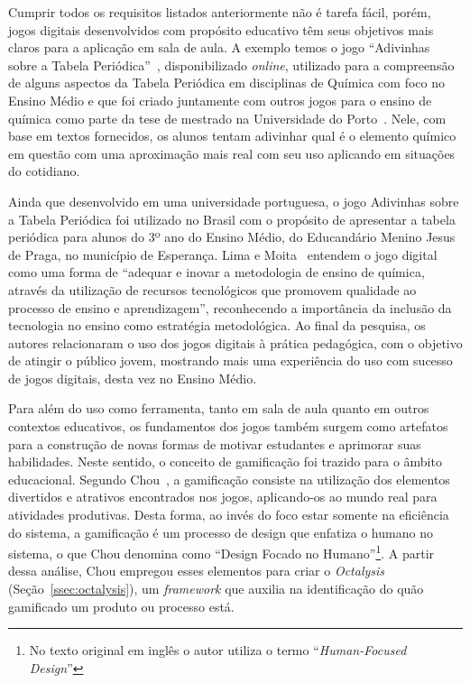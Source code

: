 Cumprir todos os requisitos listados anteriormente não é tarefa fácil, porém, jogos digitais desenvolvidos com propósito educativo têm seus objetivos mais claros para a aplicação em sala de aula. A exemplo temos o jogo “Adivinhas sobre a Tabela Periódica”~\cite{ramos_adivinhas_2004}, disponibilizado \textit{online}, utilizado para a compreensão de alguns aspectos da Tabela Periódica em disciplinas de Química com foco no Ensino Médio e que foi criado juntamente com outros jogos para o ensino de química como parte da tese de mestrado na Universidade do Porto~\cite{ramos_utilizacao_2004}. Nele, com base em textos fornecidos, os alunos tentam adivinhar qual é o elemento químico em questão com uma aproximação mais real com seu uso aplicando em situações do cotidiano.

Ainda que desenvolvido em uma universidade portuguesa, o jogo Adivinhas sobre a Tabela Periódica foi utilizado no Brasil com o propósito de apresentar a tabela periódica para alunos do 3º ano do Ensino Médio, do Educandário Menino Jesus de Praga, no município de Esperança. Lima e Moita~\cite[~p. 142]{lima_tecnologia_2011} entendem o jogo digital como uma forma de “adequar e inovar a metodologia de ensino de química, através da utilização de recursos tecnológicos que promovem qualidade ao processo de ensino e aprendizagem”, reconhecendo a importância da inclusão da tecnologia no ensino como estratégia metodológica. Ao final da pesquisa, os autores relacionaram o uso dos jogos digitais à prática pedagógica, com o objetivo de atingir o público jovem, mostrando mais uma experiência do uso com sucesso de jogos digitais, desta vez no Ensino Médio.

Para além do uso como ferramenta, tanto em sala de aula quanto em outros contextos educativos, os fundamentos dos jogos também surgem como artefatos para a construção de novas formas de motivar estudantes e aprimorar suas habilidades. Neste sentido, o conceito de gamificação foi trazido para o âmbito educacional. Segundo Chou~\cite{chou_what_2017}, a gamificação consiste na utilização dos elementos divertidos e atrativos encontrados nos jogos, aplicando-os ao mundo real para atividades produtivas. Desta forma, ao invés do foco estar somente na eficiência do sistema, a gamificação é um processo de design que enfatiza o humano no sistema, o que Chou denomina como “Design Focado no Humano”\footnote{No texto original em inglês o autor utiliza o termo “\textit{Human-Focused Design}”}.  A partir dessa análise, Chou empregou esses elementos para criar o \textit{Octalysis} (Seção~\ref{ssec:octalysis}), um \textit{framework} que auxilia na identificação do quão gamificado um produto ou processo está.

